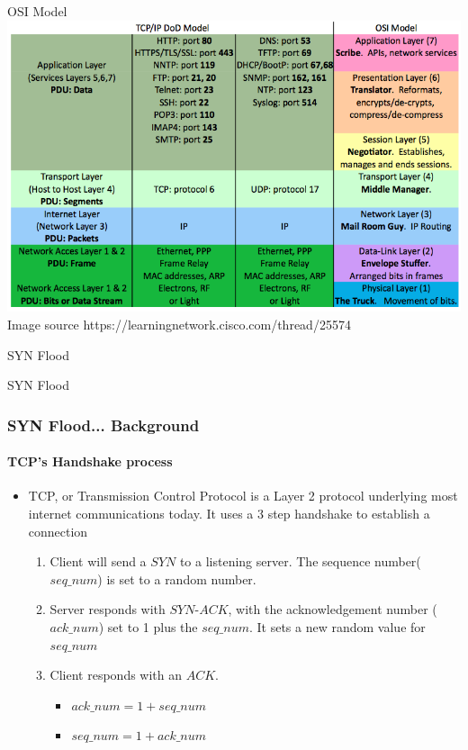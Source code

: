 \documentclass{beamer}
\begin{document}
\begin{frame}{OSI Model}
	\includegraphics[width=\textwidth]{images/osi2.png} \newline
	{\footnotesize Image source https://learningnetwork.cisco.com/thread/25574}
\end{frame}

\begin{frame}{SYN Flood}
	\begin{center}
		\vspace*{\fill}
		{\Large SYN Flood}
		\vspace*{\fill}
	\end{center}
\end{frame}

\begin{frame}
	\frametitle{SYN Flood... Background}
	\framesubtitle{TCP's Handshake process}
	\begin{itemize}
		\item TCP, or Transmission Control Protocol is a Layer 2 protocol underlying
			most internet communications today.  It uses a 3 step handshake to
			establish a connection
			\begin{enumerate}
				\item Client will send a $SYN$ to a listening server.  The sequence
					number($seq\_num$) is set to a random number.
				\item Server responds with $SYN$-$ACK$, with the acknowledgement number
					($ack\_num$) set to 1 plus the $seq\_num$.  It sets a new random value
					for $seq\_num$
				\item Client responds with an $ACK$.
					\begin{itemize}
						\item $ack\_num = 1 + seq\_num$
						\item $seq\_num = 1 + ack\_num$
					\end{itemize}
			\end{enumerate}
	\end{itemize}
\end{frame}
\end{document}
